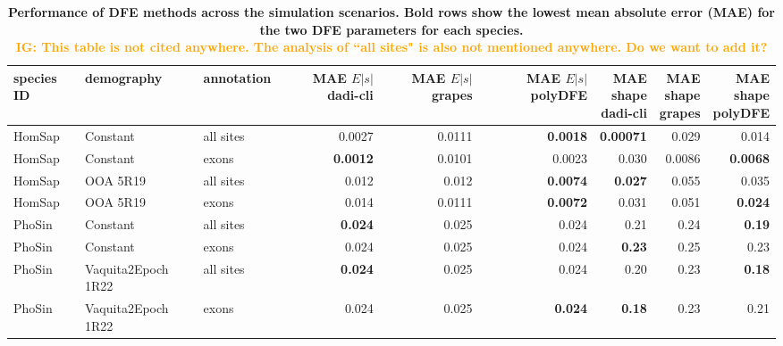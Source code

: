 \documentclass[hidelinks]{article}
\newcommand{\stopsupplement}{%
        \setcounter{table}{0}
        \renewcommand{\thetable}{\arabic{table}}%
        \setcounter{figure}{0}
        \renewcommand{\thefigure}{\arabic{figure}}%
     }
\newcommand{\igcomment}[1]{\textcolor{orange}{IG: #1}}
\begin{document}
\begin{table}[ht]
\centering
\small

\caption{\bf{Performance of DFE methods across the simulation scenarios}. 
Bold rows show the lowest mean absolute error (MAE) for the two DFE parameters
for each species.\\
\igcomment{This table is not cited anywhere. The analysis of ``all sites" is also not mentioned anywhere. Do we want to add it?}
}
\begin{tabular}{lllrrrrrr}
\toprule
species ID & demography & annotation & \makecell{MAE \\ $E|s|$ \\ dadi-cli} & \makecell{MAE \\ $E|s|$ \\ grapes} & \makecell{MAE \\ $E|s|$ \\ polyDFE} & \makecell{MAE \\ shape \\ dadi-cli} & \makecell{MAE \\ shape \\ grapes} & \makecell{MAE \\ shape \\ polyDFE} \\
\midrule
HomSap & Constant & all sites & 0.0027 & 0.0111 & \bf{0.0018} & \bf{0.00071} & 0.029 & 0.014 \\
HomSap & Constant & exons & \bf{0.0012} & 0.0101 & 0.0023 & 0.030 & 0.0086 & \bf{0.0068} \\
HomSap & OOA 5R19 & all sites & 0.012 & 0.012 & \bf{0.0074} & \bf{0.027} & 0.055 & 0.035 \\
HomSap & OOA 5R19 & exons & 0.014 & 0.0111 & \bf{0.0072} & 0.031 & 0.051 & \bf{0.024} \\
PhoSin & Constant & all sites & \bf{0.024} & 0.025 & 0.024 & 0.21 & 0.24 & \bf{0.19} \\
PhoSin & Constant & exons & 0.024 & 0.025 & 0.024 & \bf{0.23} & 0.25 & 0.23 \\
PhoSin & Vaquita2Epoch 1R22 & all sites & \bf{0.024} & 0.025 & 0.024 & 0.20 & 0.23 & \bf{0.18} \\
PhoSin & Vaquita2Epoch 1R22 & exons & 0.024 & 0.025 & \bf{0.024} & \bf{0.18} & 0.23 & 0.21 \\
\bottomrule
\end{tabular}
\label{tab:dfe_table}
\end{table}

\stopsupplement
\end{document}
